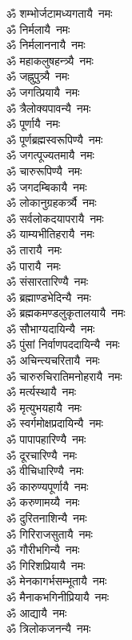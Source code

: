 \begin{multicols}{2}
\begin{flushleft}
ॐ शम्भोर्जटामध्यगतायै~नमः\\
ॐ निर्मलायै~नमः\hfill{}\\
ॐ निर्मलाननायै~नमः\\
ॐ महाकलुषहन्त्र्यै~नमः\\
ॐ जह्नुपुत्र्यै~नमः\\
ॐ जगत्प्रियायै~नमः\\
ॐ त्रैलोक्यपावन्यै~नमः\\
ॐ पूर्णायै~नमः\\
ॐ पूर्णब्रह्मस्वरूपिण्यै~नमः\\
ॐ जगत्पूज्यतमायै~नमः\\
ॐ चारुरूपिण्यै~नमः\\
ॐ जगदम्बिकायै~नमः\hfill{}\\
ॐ लोकानुग्रहकर्त्र्यै~नमः\\
ॐ सर्वलोकदयापरायै~नमः\\
ॐ याम्यभीतिहरायै~नमः\\
ॐ तारायै~नमः\\
ॐ पारायै~नमः\\
ॐ संसारतारिण्यै~नमः\\
ॐ ब्रह्माण्डभेदिन्यै~नमः\\
ॐ ब्रह्मकमण्डलुकृतालयायै~नमः\\
ॐ सौभाग्यदायिन्यै~नमः\\
ॐ पुंसां निर्वाणपददायिन्यै~नमः\hfill{}\\
ॐ अचिन्त्यचरितायै~नमः\\
ॐ चारुरुचिरातिमनोहरायै~नमः\\
ॐ मर्त्यस्थायै~नमः\\
ॐ मृत्युभयहायै~नमः\\
ॐ स्वर्गमोक्षप्रदायिन्यै~नमः\\
ॐ पापापहारिण्यै~नमः\\
ॐ दूरचारिण्यै~नमः\\
ॐ वीचिधारिण्यै~नमः\\
ॐ कारुण्यपूर्णायै~नमः\\
ॐ करुणामय्यै~नमः\hfill{}\\
ॐ दुरितनाशिन्यै~नमः\\
ॐ गिरिराजसुतायै~नमः\\
ॐ गौरीभगिन्यै~नमः\\
ॐ गिरिशप्रियायै~नमः\\
ॐ मेनकागर्भसम्भूतायै~नमः\\
ॐ मैनाकभगिनीप्रियायै~नमः\\
ॐ आद्यायै~नमः\\
ॐ त्रिलोकजनन्यै~नमः\\

\end{flushleft}
\end{multicols}
